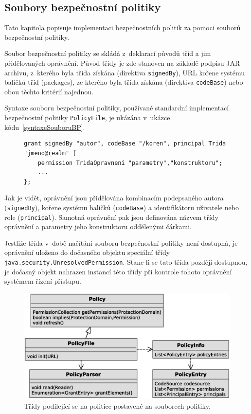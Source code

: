 \subsection{Soubory bezpečnostní politiky} \label{souboryBP}

Tato kapitola popisuje implementaci bezpečnostních politik za pomoci souborů bezpečnostní politiky.

Soubor bezpečnostní politiky se skládá z~deklarací původů tříd a jim přidělovaných oprávnění.
Původ třídy je zde stanoven na základě podpisu JAR archivu, z~kterého byla třída získána (direktiva {\tt signedBy}), URL kořene systému balíčků tříd (packages), ze kterého byla třída získána (direktiva {\tt codeBase}) nebo obou těchto kritérií najednou.~\cite{oaks}

Syntaxe souboru bezpečnostní politiky, používané standardní implementací bezpečnostní politiky {\tt PolicyFile}, je ukázána v~ukázce kódu~\ref{syntaxeSouboruBP}.~\cite{oaks}\cite{refPolicyFiles}

\begin{figure}[tbh]
\begin{lstlisting}[caption=Syntaxe souboru bezpečnostní politiky, label=syntaxeSouboruBP]
grant signedBy "autor", codeBase "/koren", principal Trida "jmeno@realm" {
    permission TridaOpravneni "parametry","konstruktoru";
    ...
};
\end{lstlisting}
\end{figure}

Jak je vidět, oprávnění jsou přidělována kombinacím podepsaného autora ({\tt signedBy}), kořene systému balíčků ({\tt codeBase}) a identifikátoru uživatele nebo role ({\tt principal}).
Samotná oprávnění pak jsou definována názvem třídy oprávnění a parametry jeho konstruktoru oddělenými čárkami.

Jestliže třída v~době načítání souboru bezpečnostní politiky není dostupná, je oprávnění uloženo do dočasného objektu speciální třídy {\tt java.security.UnresolvedPermission}.
Stane-li se tato třída později dostupnou, je dočasný objekt nahrazen instancí této třídy při kontrole tohoto oprávnění systémem řízení přístupu.~\cite{refUnresolvedPermission}

\begin{figure}[ht]
  \centering
  \includegraphics[width=12cm]{fig/policy-schema}
  \caption{Třídy podílející se na politice postavené na souborech politiky.}
  \label{tridyPolicyFile}
\end{figure}

